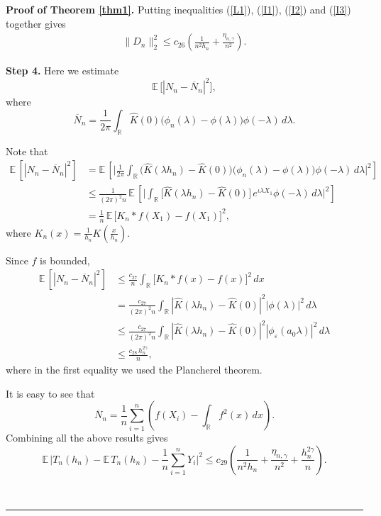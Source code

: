 \documentclass[11pt]{article}
\newenvironment{proof}[1][Proof]{\textbf{#1.} }{\
\rule{0.5em}{0.5em}}
\def\R{{\mathbb R}}
\def\E{{{\mathbb E}\,}}
\begin{document}
\begin{proof}[Proof of Theorem \ref{thm1}]
Putting inequalities (\ref{L1}), (\ref{I1}), (\ref{I2}) and (\ref{I3}) together gives 
\begin{align*}
\|D_n\|^2_2\leq c_{26} \left(\frac{1}{n^2 h_n}+\frac{\eta_{n,\gamma}}{n^2} \right).
\end{align*}




\medskip \noindent
\textbf{Step 4.} Here we estimate 
\[
\E\big[|N_n-\overline{N}_n|^2\big],
\]
where 
\[
\overline{N}_n=\frac{1}{2\pi}\int_{\R} \widehat{K}(0) \big(\phi_n(\lambda)-\phi(\lambda) \big) \phi(-\lambda) \,  d\lambda.
\]

Note that 
\begin{align*} 
\E\left[|N_n-\overline{N}_n|^2\right]
&=\E\left[ \Big|\frac{1}{2\pi}\int_{\R} \big(\widehat{K}(\lambda h_n)-\widehat{K}(0)\big)\big(\phi_n(\lambda)-\phi(\lambda) \big) \phi(-\lambda) \,  d\lambda\Big|^2\right]\\
&\leq \frac{1}{(2\pi)^2n} \, \E\left[ \Big|\int_{\R} \big[\widehat{K}(\lambda h_n)-\widehat{K}(0)\big]\, e^{\iota\lambda  X_1}\phi(-\lambda) \,  d\lambda\Big|^2\right]\\
&= \frac{1}{n} \, \E\Big[K_n* f(X_1)-f(X_1)\Big]^2,
\end{align*}
where $K_n(x)=\frac{1}{h_n}K(\frac{x}{h_n})$.

Since $f$ is bounded,
\begin{align*} 
\E\left[|N_n-\overline{N}_n|^2\right]
&\leq \frac{ c_{27}}{n} \int_{\R} \big[ K_n* f(x)-f(x) \big]^2\, dx \\
&= \frac{c_{27}}{(2\pi)^2 n} \int_{\R}|\widehat{K}(\lambda h_n)-\widehat{K}(0)|^2|\phi(\lambda)|^2\, d\lambda \\
&\leq \frac{c_{27}}{(2\pi)^2 n} \int_{\R}|\widehat{K}(\lambda h_n)-\widehat{K}(0)|^2|\phi_{\varepsilon}(a_0\lambda)|^2\, d\lambda \\
&\leq \frac{c_{28}\, h^{2\gamma}_n}{n},
\end{align*}
where in the first equality we used the Plancherel theorem.


It is easy to see that 
\[
\overline{N}_n
=\frac{1}{n} \sum\limits^n_{i=1}\left(f(X_i)-\int_{\R} f^2(x)\, dx\right).
\] 
Combining all the above results gives 
\[
\E\Big|T_n(h_n)-\E T_n(h_n)-\frac{1}{n}\sum^n_{i=1}Y_i\Big|^2\leq c_{29}\left(\frac{1}{n^2 h_n}+\frac{\eta_{n,\gamma}}{n^2}+\frac{h^{2\gamma}_n}{n}\right).
\]


\end{proof}
\end{document}
